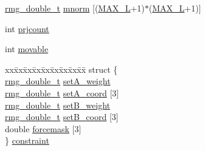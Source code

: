 \begin{DoxyCompactItemize}
\item 
\hyperlink{rmgtypes_8h_aaa16921c14f121c56eaa42390a340db8}{rmg\-\_\-double\-\_\-t} \hyperlink{struct_i_o_n_a41b80107368a9a9711947a27618e7c5d}{mnorm} \mbox{[}(\hyperlink{_t_d_d_f_t_2_headers_2params_8h_adf2a0717e3307419a9d7c52707f5631e}{M\-A\-X\-\_\-\-L}+1)$\ast$(\hyperlink{_t_d_d_f_t_2_headers_2params_8h_adf2a0717e3307419a9d7c52707f5631e}{M\-A\-X\-\_\-\-L}+1)\mbox{]}
\item 
int \hyperlink{struct_i_o_n_ad78c604b2cab2159e22be5fecc9909ac}{prjcount}
\item 
int \hyperlink{struct_i_o_n_abadac1a4be93446c54df8fb5e082113b}{movable}
\item 
\begin{tabbing}
xx\=xx\=xx\=xx\=xx\=xx\=xx\=xx\=xx\=\kill
struct \{\\
\>\hyperlink{rmgtypes_8h_aaa16921c14f121c56eaa42390a340db8}{rmg\_double\_t} \hyperlink{struct_i_o_n_a6ca1c1c73cd02271c684e472c7c28120}{setA\_weight}\\
\>\hyperlink{rmgtypes_8h_aaa16921c14f121c56eaa42390a340db8}{rmg\_double\_t} \hyperlink{struct_i_o_n_a51deed9594a4ee59087831247fd5ee5a}{setA\_coord} \mbox{[}3\mbox{]}\\
\>\hyperlink{rmgtypes_8h_aaa16921c14f121c56eaa42390a340db8}{rmg\_double\_t} \hyperlink{struct_i_o_n_a1ad19e4f9c17f3d285c21f0c50054c23}{setB\_weight}\\
\>\hyperlink{rmgtypes_8h_aaa16921c14f121c56eaa42390a340db8}{rmg\_double\_t} \hyperlink{struct_i_o_n_a2da946f6951e9ca47d243d26bd0cbbef}{setB\_coord} \mbox{[}3\mbox{]}\\
\>double \hyperlink{struct_i_o_n_aad2ce507f2dcf5c4605a824a1b077cb2}{forcemask} \mbox{[}3\mbox{]}\\
\} \hyperlink{struct_i_o_n_a16d5ff101c1a5fc8ac100fc67d68026e}{constraint}\\


\end{tabbing}
\end{DoxyCompactItemize}
